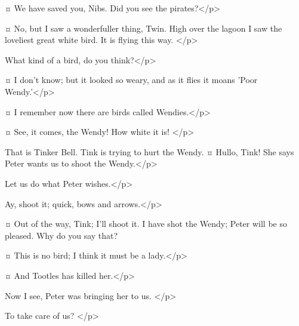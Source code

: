 \firsttwinspeaks {}¤
We have saved you, Nibs.
Did you see the pirates?</p>

\nibsspeaks {}¤
No, but I saw a wonderfuller thing, Twin.
High over the lagoon I saw the loveliest great white bird.
It is flying this way.
</p>

\tootlesspeaks
What kind of a bird, do you think?</p>

\nibsspeaks {}¤
I don't know; but it looked so weary, and as it flies it moans 'Poor Wendy.'</p>

\slightlyspeaks {}¤
I remember now there are birds called Wendies.</p>

\firsttwinspeaks {}¤
See, it comes, the Wendy!
How white it is!
</p>

\tootlesspeaks
That is Tinker Bell.
Tink is trying to hurt the Wendy.
¤
Hullo, Tink!
She says Peter wants us to shoot the Wendy.</p>

\nibsspeaks
Let us do what Peter wishes.</p>

\slightlyspeaks
Ay, shoot it; quick, bows and arrows.</p>

\tootlesspeaks {}¤
Out of the way, Tink; I'll shoot it.
I have shot the Wendy; Peter will be so pleased.
Why do you say that?

\slightlyspeaks {}¤
This is no bird; I think it must be a lady.</p>

\nibsspeaks {}¤
And Tootles has killed her.</p>

\curlyspeaks
Now I see, Peter was bringing her to us.
</p>

\secondtwinspeaks
To take care of us?
</p>

